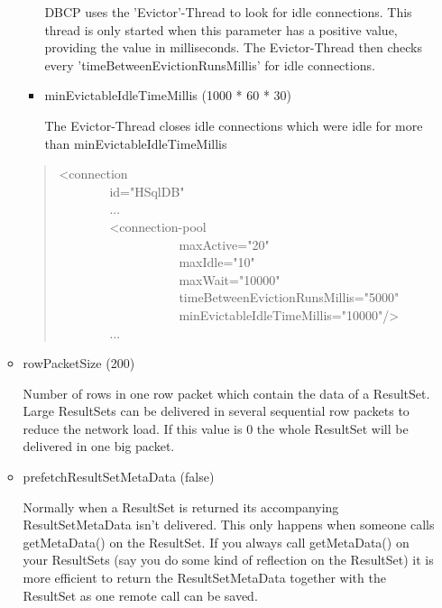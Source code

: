 \documentclass[10pt,a4paper,english]{article}
\newlength{\admonitionwidth}
\begin{document}
\begin{itemize}
\begin{itemize}
\begin{itemize}
DBCP uses the 'Evictor'-Thread to look for idle connections. This thread is only started when this parameter has a positive value, providing the value in milliseconds. The Evictor-Thread then checks every 'timeBetweenEvictionRunsMillis' for idle connections.

\item {} 
minEvictableIdleTimeMillis (1000 * 60 * 30)

The Evictor-Thread closes idle connections which were idle for more than minEvictableIdleTimeMillis

\end{itemize}
\begin{quote}{\ttfamily \raggedright \noindent
<connection~\\
~~~~~~~~id="HSqlDB"~\\
~~~~~~~~...~\\
~~~~~~~~<connection-pool~~\\
~~~~~~~~~~~~~~~~~~~maxActive="20"~~\\
~~~~~~~~~~~~~~~~~~~maxIdle="10"~\\
~~~~~~~~~~~~~~~~~~~maxWait="10000"~\\
~~~~~~~~~~~~~~~~~~~timeBetweenEvictionRunsMillis="5000"~\\
~~~~~~~~~~~~~~~~~~~minEvictableIdleTimeMillis="10000"/>~\\
~~~~~~~~...~~~~~~~
}\end{quote}

\item {} 
rowPacketSize (200)

Number of rows in one row packet which contain the data of a ResultSet. Large ResultSets can be delivered in several sequential row packets to reduce the network load. If this value is 0 the whole ResultSet will be delivered in one big packet.

\item {} 
prefetchResultSetMetaData (false)

Normally when a ResultSet is returned its accompanying ResultSetMetaData isn't delivered. This only happens when someone calls getMetaData() on the ResultSet. If you always call getMetaData() on your ResultSets (say you do some kind of reflection on the ResultSet) it is more efficient to return the ResultSetMetaData together with the ResultSet as one remote call can be saved.
\begin{quote}
\begin{center}\begin{sffamily}
\end{sffamily}
\end{center}
\end{quote}
\end{itemize}
\end{itemize}
\end{document}
